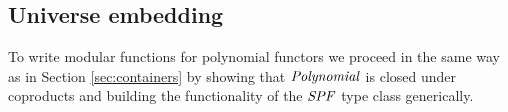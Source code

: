 \begin{hscode}\SaveRestoreHook
{}%
%
%
%
%
\>[3]{}\;\;\;\<[E]%
\\
\>[3]{}\<[5]%
\>[5]{}\<[24]%
\>[24]{}\mathrel{=}\;\;\<[E]%
\\
\>[3]{}\<[5]%
\>[5]{}\<[24]%
\>[24]{}\mathrel{=}\<[E]%
\\
\>[3]{}\<[5]%
\>[5]{}\<[24]%
\>[24]{}\mathrel{=}\<[E]%
\\
\>[3]{}\<[5]%
\>[5]{}\<[24]%
\>[24]{}\mathrel{=}\<[E]%
\\
\>[3]{}\<[5]%
\>[5]{}\<[24]%
\>[24]{}\mathrel{=}\<[E]%
\ColumnHook
\end{hscode}\resethooks

\subsection{Universe embedding}

To write modular functions for polynomial functors we proceed in
the same way as in Section \ref{sec:containers} by showing that
\ensuremath{\Conid{Polynomial}} is closed under coproducts and building the functionality
of the \ensuremath{\Conid{SPF}} type class generically.

